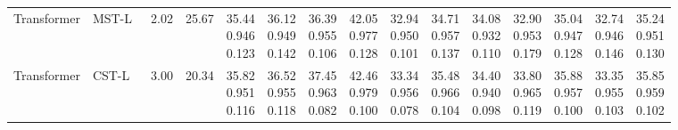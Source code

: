 \documentclass[letterpaper]{article} %
\begin{document}
\begin{table}[!t]
{\begin{tabular}{ll|cc|*{10}{c}|c}
\rowcolor{compareorange}
Transformer & MST-L~\cite{cai2022mst} & 2.02 & 25.67 & \makecell{35.44\\0.946\\0.123} & \makecell{36.12\\0.949\\0.142} & \makecell{36.39\\0.955\\0.106} & \makecell{42.05\\0.977\\0.128} & \makecell{32.94\\0.950\\0.101} & \makecell{34.71\\0.957\\0.137} & \makecell{34.08\\0.932\\0.110} & \makecell{32.90\\0.953\\0.179} & \makecell{35.04\\0.947\\0.128} & \makecell{32.74\\0.946\\0.146} & \makecell{35.24\\0.951\\0.130} \\
\rowcolor{compareorange}
Transformer & CST-L~\cite{cai2022cst} & 3.00 & 20.34 & \makecell{35.82\\0.951\\0.116} & \makecell{36.52\\0.955\\0.118} & \makecell{37.45\\0.963\\0.082} & \makecell{42.46\\0.979\\0.100} & \makecell{33.34\\0.956\\0.078} & \makecell{35.48\\0.966\\0.104} & \makecell{34.40\\0.940\\0.098} & \makecell{33.80\\0.965\\0.119} & \makecell{35.88\\0.957\\0.100} & \makecell{33.35\\0.955\\0.103} & \makecell{35.85\\0.959\\0.102} \\

\end{tabular}}
\end{table}
\end{document}
